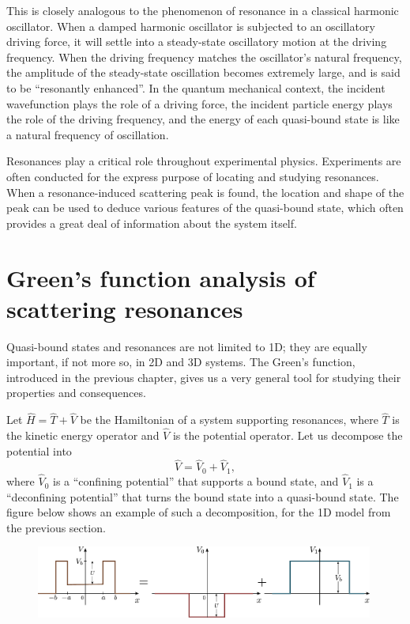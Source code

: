 \documentclass[pra,12pt]{revtex4}
\begin{document}
This is closely analogous to the phenomenon of resonance in a
classical harmonic oscillator.  When a damped harmonic oscillator is
subjected to an oscillatory driving force, it will settle into a
steady-state oscillatory motion at the driving frequency.  When the
driving frequency matches the oscillator's natural frequency, the
amplitude of the steady-state oscillation becomes extremely large, and
is said to be ``resonantly enhanced''.  In the quantum mechanical
context, the incident wavefunction plays the role of a driving force,
the incident particle energy plays the role of the driving frequency,
and the energy of each quasi-bound state is like a natural frequency
of oscillation.

Resonances play a critical role throughout experimental physics.
Experiments are often conducted for the express purpose of locating
and studying resonances.  When a resonance-induced scattering peak is
found, the location and shape of the peak can be used to deduce
various features of the quasi-bound state, which often provides a
great deal of information about the system itself.

\section{Green's function analysis of scattering resonances}
\label{sec:green_resonances}

Quasi-bound states and resonances are not limited to 1D; they are
equally important, if not more so, in 2D and 3D systems.  The Green's
function, introduced in the previous chapter, gives us a very general
tool for studying their properties and consequences.

Let $\hat{H} = \hat{T} + \hat{V}$ be the Hamiltonian of a system
supporting resonances, where $\hat{T}$ is the kinetic energy operator
and $\hat{V}$ is the potential operator.  Let us decompose the
potential into
$$\hat{V} = \hat{V}_0 + \hat{V}_1,$$
where $\hat{V}_0$ is a ``confining potential'' that supports a bound
state, and $\hat{V}_1$ is a ``deconfining potential'' that turns the
bound state into a quasi-bound state.  The figure below shows an
example of such a decomposition, for the 1D model from the previous
section.

\begin{figure}[h]
  \centering\includegraphics[width=0.99\textwidth]{resonancewell_decomp}
\end{figure}
\end{document}
